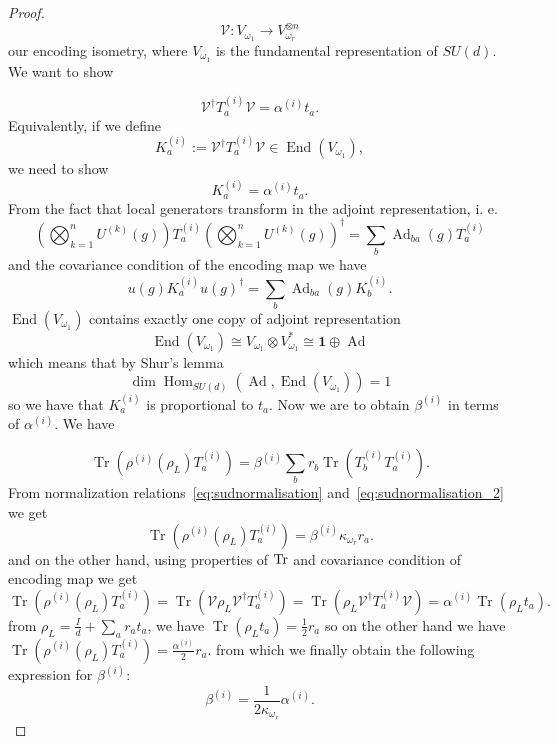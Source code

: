 \documentclass[11pt,letterpaper]{article}
\theoremstyle{plain}
\theoremstyle{plain}
\theoremstyle{plain}
\theoremstyle{plain}
\theoremstyle{plain}
\theoremstyle{plain}
\theoremstyle{plain}
\theoremstyle{definition}
\theoremstyle{plain}
\begin{document}
\begin{proof}
\[
    \mathcal{V}: V_{\omega_1} \rightarrow V_{\omega_r}^{\otimes n}
\]
our encoding isometry, where $V_{\omega_1}$ is the fundamental representation of $SU(d)$. 
We want to show

\[
\mathcal{V}^{\dagger} T_a^{(i)} \mathcal{V}=\alpha^{(i)} t_a.
\]
Equivalently, if we define
\begin{equation}\label{eq:Vt_aV}
     K_a^{(i)}:=\mathcal{V}^{\dagger} T_a^{(i)} \mathcal{V} \in \operatorname{End}\left(V_{\omega_1}\right),
\end{equation}
we need to show
\[
    K_a^{(i)}=\alpha^{(i)} t_a.
\]
From the fact that local generators transform in the adjoint representation, i. e.
\[
     \left(\bigotimes_{k=1}^n U^{(k)}(g)\right) T_a^{(i)} \left(\bigotimes_{k=1}^n U^{(k)}(g)\right)^{\dagger}=\sum_b \operatorname{Ad}_{b a}(g) T_a^{(i)}
\]
and the covariance condition of the encoding map we have
\[
     u(g) K_a^{(i)} u(g)^{\dagger}=\sum_b \operatorname{Ad}_{b a}(g) K_b^{(i)}.
\]
$\operatorname{End}\left(V_{\omega_1}\right)$ contains exactly one copy of adjoint representation
\[
     \operatorname{End}\left(V_{\omega_1}\right) \cong V_{\omega_1} \otimes V_{\omega_1}^* \cong \mathbf{1} \oplus \operatorname{Ad}
\]
which means that by Shur's lemma
\[
     \operatorname{dim} \operatorname{Hom}_{S U(d)}\left(\operatorname{Ad}, \operatorname{End}\left(V_{\omega_1}\right)\right)=1
\]
so we have that $K_a^{(i)}$ is proportional to $t_a$. Now we are to obtain $\beta^{(i)}$ in terms of $\alpha^{(i)}$. We have

\[
     \operatorname{Tr}\left(\rho^{(i)}\left(\rho_L\right) T_a^{(i)}\right)=\beta^{(i)} \sum_b r_b \operatorname{Tr}\left(T_b^{(i)} T_a^{(i)}\right) .
\]
From normalization relations~\eqref{eq:sudnormalisation} and~\eqref{eq:sudnormalisation_2} we get
\[
     \operatorname{Tr}\left(\rho^{(i)}\left(\rho_L\right) T_a^{(i)}\right)=\beta^{(i)} \kappa_{\omega_r} r_a .
\]
and on the other hand, using properties of $\Tr$ and covariance condition of encoding map we get
\[
     \operatorname{Tr}\left(\rho^{(i)}\left(\rho_L\right) T_a^{(i)}\right)=\operatorname{Tr}\left(\mathcal{V} \rho_L \mathcal{V}^{\dagger} T_a^{(i)}\right)=
     \operatorname{Tr}\left(\rho_L \mathcal{V}^{\dagger} T_a^{(i)} \mathcal{V}\right)=\alpha^{(i)} \operatorname{Tr}\left(\rho_L t_a\right) .
\]
from $\rho_L=\frac{I}{d}+\sum_a r_a t_a$, we have
$
     \operatorname{Tr}\left(\rho_L t_a\right)=\frac{1}{2} r_a
$
so on the other hand we have
$
     \operatorname{Tr}\left(\rho^{(i)}\left(\rho_L\right) T_a^{(i)}\right)=\frac{\alpha^{(i)}}{2} r_a .
$
from which we finally obtain the following expression for $\beta^{(i)}$:
\[
     \beta^{(i)}=\frac{1}{2\kappa_{\omega_r}}\alpha^{(i)}  .
\]


\end{proof}
\end{document}
